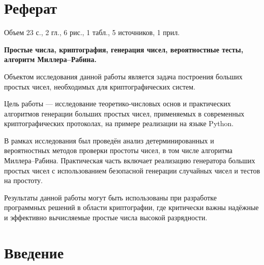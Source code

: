 \documentclass[14pt,openany,a4paper,oneside]{extarticle}
\begin{document}
	\setcounter{page}{2}
	\section*{Реферат}
	\thispagestyle{empty}
	
	Объем 23 с., 2 гл., 6 рис., 1 табл., 5 источников, 1 прил.
	
	\textbf{Простые числа, криптография, генерация чисел, вероятностные тесты, алгоритм Миллера–Рабина.}
	
	Объектом исследования данной работы является задача построения больших простых чисел, необходимых для криптографических систем.
	
	Цель работы — исследование теоретико-числовых основ и практических алгоритмов генерации больших простых чисел, применяемых в современных криптографических протоколах, на примере реализации на языке Python.
	
	В рамках исследования был проведён анализ детерминированных и вероятностных методов проверки простоты чисел, в том числе алгоритма Миллера–Рабина. Практическая часть включает реализацию генератора больших простых чисел с использованием безопасной генерации случайных чисел и тестов на простоту.
	
	Результаты данной работы могут быть использованы при разработке программных решений в области криптографии, где критически важны надёжные и эффективно вычисляемые простые числа высокой разрядности.
	
	\newpage
	\def\contentsname{Содержание}
	
	\tableofcontents
	
	\newpage
	\section*{Введение}
\end{document}

